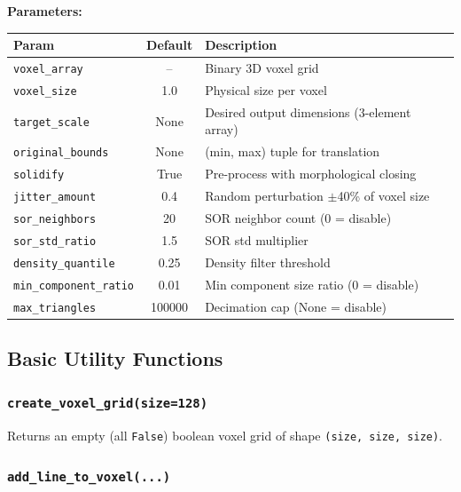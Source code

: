 \documentclass[12pt,a4paper]{article}
\begin{document}
\textbf{Parameters:}
\begin{table}[H]
\centering
\small
\begin{tabular}{lcp{6.5cm}}
\toprule
\textbf{Param} & \textbf{Default} & \textbf{Description} \\
\midrule
\texttt{voxel\_array} & -- & Binary 3D voxel grid \\
\texttt{voxel\_size} & 1.0 & Physical size per voxel \\
\texttt{target\_scale} & None & Desired output dimensions (3-element array) \\
\texttt{original\_bounds} & None & (min, max) tuple for translation \\
\texttt{solidify} & True & Pre-process with morphological closing \\
\texttt{jitter\_amount} & 0.4 & Random perturbation $\pm$40\% of voxel size \\
\texttt{sor\_neighbors} & 20 & SOR neighbor count (0 = disable) \\
\texttt{sor\_std\_ratio} & 1.5 & SOR std multiplier \\
\texttt{density\_quantile} & 0.25 & Density filter threshold \\
\texttt{min\_component\_ratio} & 0.01 & Min component size ratio (0 = disable) \\
\texttt{max\_triangles} & 100000 & Decimation cap (None = disable) \\
\bottomrule
\end{tabular}
\normalsize
\end{table}

\subsection{Basic Utility Functions}

\subsubsection{\texttt{create\_voxel\_grid(size=128)}}

Returns an empty (all \texttt{False}) boolean voxel grid of shape \texttt{(size, size, size)}.

\subsubsection{\texttt{add\_line\_to\_voxel(...)}}
\end{document}
